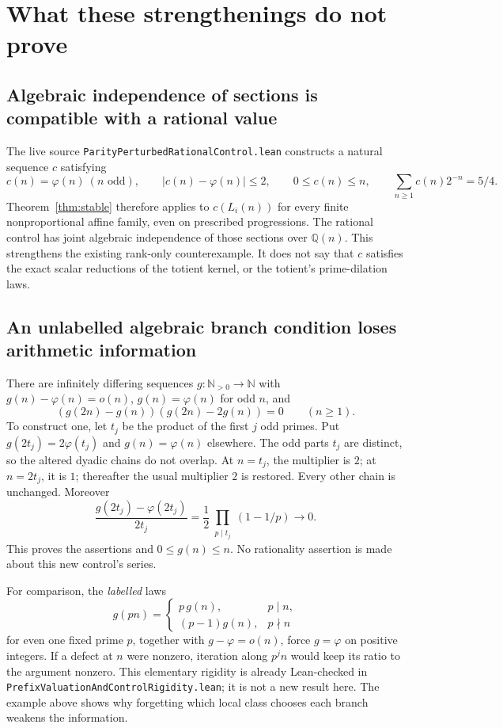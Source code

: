 \documentclass[11pt,a4paper]{article}
\theoremstyle{definition}\newtheorem{definition}[theorem]{Definition}
\theoremstyle{remark}\newtheorem{remark}[theorem]{Remark}
\newcommand{\Q}{\mathbb Q}\newcommand{\R}{\mathbb R}\newcommand{\Z}{\mathbb Z}\newcommand{\N}{\mathbb N}
\newcommand{\ph}{\varphi}\newcommand{\rad}{\operatorname{rad}}
\begin{document}
\section{What these strengthenings do not prove}\label{sec:boundaries}
\subsection{Algebraic independence of sections is compatible with a rational value}
The live source \texttt{ParityPerturbedRationalControl.lean} constructs a natural
sequence $c$ satisfying
\[
 c(n)=\ph(n)\ (n\text{ odd}),\qquad |c(n)-\ph(n)|\le2,\qquad
 0\le c(n)\le n,\qquad \sum_{n\ge1}c(n)2^{-n}=5/4.
\]
Theorem~\ref{thm:stable} therefore applies to $c(L_i(n))$ for every finite
nonproportional affine family, even on prescribed progressions.
The rational control has joint algebraic independence of those sections over
$\Q(n)$. This strengthens the existing rank-only counterexample.
It does not say that $c$ satisfies the exact scalar reductions of the totient
kernel, or the totient's prime-dilation laws.

\subsection{An unlabelled algebraic branch condition loses arithmetic information}
There are infinitely differing sequences $g:\N_{>0}\to\N$ with
$g(n)-\ph(n)=o(n)$, $g(n)=\ph(n)$ for odd $n$, and
\[
 (g(2n)-g(n))(g(2n)-2g(n))=0\qquad(n\ge1).
\]
To construct one, let $t_j$ be the product of the first $j$ odd primes.
Put $g(2t_j)=2\ph(t_j)$ and $g(n)=\ph(n)$ elsewhere.
The odd parts $t_j$ are distinct, so the altered dyadic chains do not overlap.
At $n=t_j$, the multiplier is $2$; at $n=2t_j$, it is $1$; thereafter the
usual multiplier $2$ is restored. Every other chain is unchanged.
Moreover
\[
 \frac{g(2t_j)-\ph(2t_j)}{2t_j}
 =\frac12\prod_{\substack{p\mid t_j}}(1-1/p)\longrightarrow0.
\]
This proves the assertions and $0\le g(n)\le n$.
No rationality assertion is made about this new control's series.

For comparison, the \emph{labelled} laws
\[
 g(pn)=\begin{cases}p\,g(n),&p\mid n,\\(p-1)g(n),&p\nmid n\end{cases}
\]
for even one fixed prime $p$, together with $g-\ph=o(n)$, force $g=\ph$
on positive integers. If a defect at $n$ were nonzero, iteration along
$p^j n$ would keep its ratio to the argument nonzero. This elementary
rigidity is already Lean-checked in
\texttt{PrefixValuationAndControlRigidity.lean}; it is not a new result here.
The example above shows why forgetting which local class chooses each branch
weakens the information.
\end{document}
